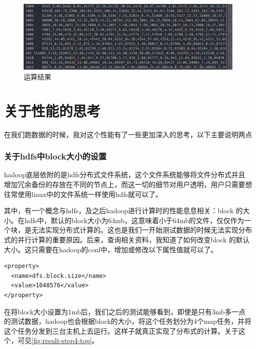 \documentclass[forprint]{myreport}
\begin{document}
\begin{figure}[htp]
  \centering
  \includegraphics[width=13cm]{"./figure/2018-07-03-14-46-28.png"}
  \caption{运算结果}
  \label{fig:result-all}
\end{figure}


\chapter{关于性能的思考}

在我们跑数据的时候，我对这个性能有了一些更加深入的思考，以下主要说明两点

\subsection{关于hdfs中block大小的设置}

hadoop底层依附的是hdfs分布式文件系统，这个文件系统能够将文件分布式并且增加冗余备份的存放在不同的节点上，而这一切的细节对用户透明，用户只需要想往常使用linux中的文件系统一样使用hdfs就可以了。

其中，有一个概念与hdfs，及之后hadoop进行计算时的性能息息相关：block 的大小。在hdfs中，默认的block大小为64mb，这意味着小于64mb的文件，仅仅作为一个块，是无法实现分布式计算的。这也是我们一开始测试数据的时候无法实现分布式的并行计算的重要原因。后来，查询相关资料，我知道了如何改变block 的默认大小。这只需要在hadoop的conf中，增加或修改以下属性值就可以了。

\begin{lstlisting}[style = c]
<property>
  <name>dfs.block.size</name>
  <value>1048576</value>
</property>
\end{lstlisting}

在将block大小设置为1mb后，我们之后的测试能够看到，即使是只有3mb多一点的测试数据，hadoop也会根据block的大小，将这个任务划分为4个map任务，并将这个任务分发到三台主机上去运行。这样子就真正实现了分布式的计算。关于这个，可见\autoref{fig:result-step4-top}。
\end{document}
